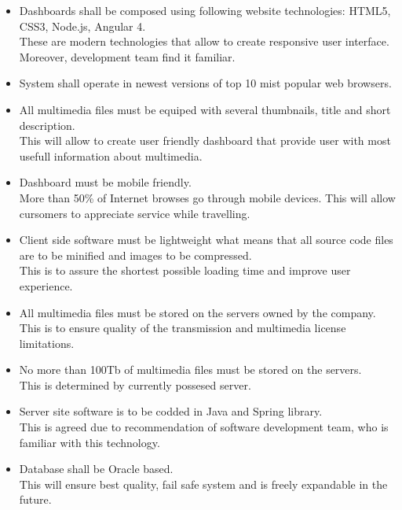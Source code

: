 \documentclass{scrreprt}
\begin{document}
\begin{itemize}
\item Dashboards shall be composed using following website technologies: HTML5, CSS3, Node.js, Angular 4.
\\These are modern technologies that allow to create responsive user interface. Moreover, development team find it familiar.

\item System shall operate in newest versions of top 10 mist popular web browsers.

\item All multimedia files must be equiped with several thumbnails, title and short description.
\\This will allow to create user friendly dashboard that provide user with most usefull information about multimedia.

\item Dashboard must be mobile friendly.
\\More than 50\% of Internet browses go through mobile devices. This will allow cursomers to appreciate service while travelling.

\item Client side software must be lightweight what means that all source code files are to be minified and images to be compressed.
\\This is to assure the shortest possible loading time and improve user experience.

\item All multimedia files must be stored on the servers owned by the company.
\\This is to ensure quality of the transmission and multimedia license limitations.

\item No more than 100Tb of multimedia files must be stored on the servers.
\\This is determined by currently possesed server.

\item Server site software is to be codded in Java and Spring library.
\\This is agreed due to recommendation of software development team, who is familiar with this technology.

\item Database shall be Oracle based.
\\This will ensure best quality, fail safe system and is freely expandable in the future.


\end{itemize}
\end{document}
